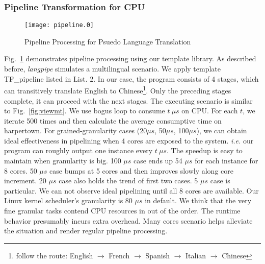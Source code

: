 \subsubsection{Pipeline Transformation for CPU}
\begin{figure}[htp]
\texttt{[image: pipeline.0]}
\caption{Pipeline Processing for Psuedo Language Translation}\label{fig:pipe}
\end{figure}

Fig.~\ref{fig:pipe} demonstrates pipeline processing using our
template library. As described before, \textit{langpipe} simulates a
multilingual scenario. We apply template TF\_pipeline listed in
List. 2. In our case, the program consists of 4 stages,
which can transitively translate English to Chinese\footnote{follow the 
  route: English  $\to$ French $\to$ Spanish $\to$ Italian $\to$
  Chinese}. Only the preceding stages complete, it can proceed with
the next stages. The executing scenario is similar to Fig.~\ref{fig:viewmt}. We use bogus loop to consume $t \  \mu s$ on CPU. For each $t$, we iterate 500
times and then calculate the average consumptive time on harpertown. For
grained-granularity cases (20$\mu s$, 50$\mu s$, 100$\mu s$), we can obtain ideal
effectiveness in pipelining when 4 cores are exposed to the system.
\textit{i.e.} our program can roughly output one instance every $t\  \mu
s$. The speedup is easy to maintain when granularity is big. 100 $\mu s$ case ends up 54 $\mu s$ for each instance for 8 cores. 50  $\mu s$ case
bumps at 5 cores and then improves slowly along core increment. 20
$\mu s$ case also holds the trend of first two cases. 5 $\mu s$ case is
particular. We can not observe ideal pipelining until all 8
cores are available.  Our Linux kernel scheduler's granularity is 80
$\mu s$ in default. We think that the very fine granular tasks contend
CPU resources in out of the order. The runtime behavior presumably
incurs extra overhead. Many cores scenario helps alleviate the
situation and render regular pipeline processing.

